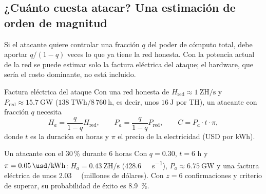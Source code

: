 \documentclass[11pt,a4paper]{article}
\begin{document}
\subsection{¿Cuánto cuesta atacar? Una estimación de orden de magnitud}

Si el atacante quiere controlar una fracción $q$ del poder de cómputo total, debe aportar $q/(1-q)$ veces lo que ya tiene la red honesta. Con la potencia actual de la red se puede estimar solo la factura eléctrica del ataque; el hardware, que sería el costo dominante, no está incluido.

\begin{resultado}{Factura eléctrica del ataque}\label{res:costo}
Con una red honesta de $H_{\text{red}}\approx 1\ \text{ZH/s}$ y $P_{\text{red}}\approx 15.7\ \text{GW}$ ($138\ \text{TWh}/8\,760\ \text{h}$, es decir, unos $16\ \text{J}$ por TH), un atacante con fracción $q$ necesita
\[
  H_a=\frac{q}{1-q}H_{\text{red}},\qquad
  P_a=\frac{q}{1-q}P_{\text{red}},\qquad
  C=P_a\cdot t\cdot \pi,
\]
donde $t$ es la duración en horas y $\pi$ el precio de la electricidad (USD por kWh).
\end{resultado}

\begin{ejemplo}{Un atacante con el 30\,\% durante 6 horas}\label{ej:costo}
Con $q=0.30$, $t=6$ h y $\pi=\SI{0.05}{\usd\per\kilo\watt\hour}$: $H_a=0.43\ \text{ZH/s}$ (\SI{428.6}{\exa\hash\per\second}), $P_a\approx 6.75\ \text{GW}$ y una factura eléctrica de unos \SI{2.03}{\mega\usd} (millones de dólares). Con $z=6$ confirmaciones y criterio de superar, su probabilidad de éxito es \SI{8.9}{\percent}.
\end{ejemplo}
\end{document}
